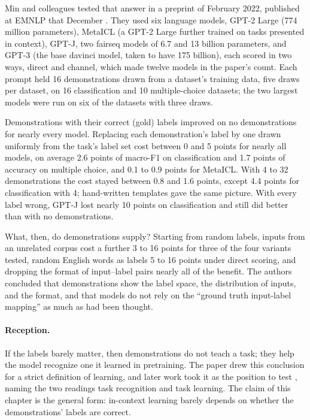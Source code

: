 \begin{refsection}
Min and colleagues tested that answer in a preprint of February 2022, published at EMNLP that December \parencite{MinEtAl2022}. They used six language models, GPT-2 Large (774 million parameters), MetaICL (a GPT-2 Large further trained on tasks presented in context), GPT-J, two fairseq models of 6.7 and 13 billion parameters, and GPT-3 (the base davinci model, taken to have 175 billion), each scored in two ways, direct and channel, which made twelve models in the paper's count. Each prompt held 16 demonstrations drawn from a dataset's training data, five draws per dataset, on 16 classification and 10 multiple-choice datasets; the two largest models were run on six of the datasets with three draws.

\begin{finding}\label{fd:instruments:min}
Demonstrations with their correct (gold) labels improved on no demonstrations for nearly every model. Replacing each demonstration's label by one drawn uniformly from the task's label set cost between 0 and 5 points for nearly all models, on average 2.6 points of macro-F1 on classification and 1.7 points of accuracy on multiple choice, and 0.1 to 0.9 points for MetaICL. With 4 to 32 demonstrations the cost stayed between 0.8 and 1.6 points, except 4.4 points for classification with 4; hand-written templates gave the same picture. With every label wrong, GPT-J lost nearly 10 points on classification and still did better than with no demonstrations.
\end{finding}

What, then, do demonstrations supply? Starting from random labels, inputs from an unrelated corpus cost a further 3 to 16 points for three of the four variants tested, random English words as labels 5 to 16 points under direct scoring, and dropping the format of input--label pairs nearly all of the benefit. The authors concluded that demonstrations show the label space, the distribution of inputs, and the format, and that models do not rely on the \enquote{ground truth input-label mapping} as much as had been thought.

\paragraph{Reception.} If the labels barely matter, then demonstrations do not teach a task; they help the model recognize one it learned in pretraining. The paper drew this conclusion for a strict definition of learning, and later work took it as the position to test \parencite{YooEtAl2022,WeiEtAl2023larger}, \textcite{PanEtAl2023} naming the two readings task recognition and task learning. The claim of this chapter is the general form: in-context learning barely depends on whether the demonstrations' labels are correct.


\end{refsection}
